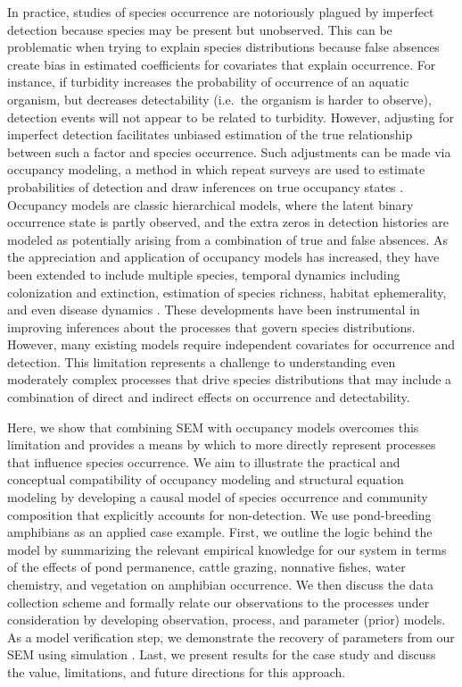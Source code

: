 In practice, studies of species occurrence are notoriously plagued by
imperfect detection because species may be present but unobserved. This
can be problematic when trying to explain species distributions because
false absences create bias in estimated coefficients for covariates that
explain occurrence. For instance, if turbidity increases the probability
of occurrence of an aquatic organism, but decreases detectability
(i.e.~the organism is harder to observe), detection events will not
appear to be related to turbidity. However, adjusting for imperfect
detection facilitates unbiased estimation of the true relationship
between such a factor and species occurrence. Such adjustments can be
made via occupancy modeling, a method in which repeat surveys are used
to estimate probabilities of detection and draw inferences on true
occupancy states \citep{MacKenzie2002}. Occupancy models are classic
hierarchical models, where the latent binary occurrence state is partly
observed, and the extra zeros in detection histories are modeled as
potentially arising from a combination of true and false absences. As
the appreciation and application of occupancy models has increased, they
have been extended to include multiple species, temporal dynamics
including colonization and extinction, estimation of species richness,
habitat ephemerality, and even disease dynamics \citep{Dorazio2010, MacKenzie2011, Miller2012}.
These developments have been
instrumental in improving inferences about the processes that govern
species distributions. However, many existing models require independent
covariates for occurrence and detection. This limitation represents a
challenge to understanding even moderately complex processes that drive
species distributions that may include a combination of direct and
indirect effects on occurrence and detectability.

Here, we show that combining SEM with occupancy models overcomes this
limitation and provides a means by which to more directly represent
processes that influence species occurrence. We aim to illustrate the
practical and conceptual compatibility of occupancy modeling and
structural equation modeling by developing a causal model of species
occurrence and community composition that explicitly accounts for
non-detection. We use pond-breeding amphibians as an applied case
example. First, we outline the logic behind the model by summarizing the
relevant empirical knowledge for our system in terms of the effects of
pond permanence, cattle grazing, nonnative fishes, water chemistry, and
vegetation on amphibian occurrence. We then discuss the data collection
scheme and formally relate our observations to the processes under
consideration by developing observation, process, and parameter (prior)
models. As a model verification step, we demonstrate the recovery of
parameters from our SEM using simulation \citep{Rykiel1996}. Last, we present
results for the case study and discuss the value, limitations, and
future directions for this approach.

